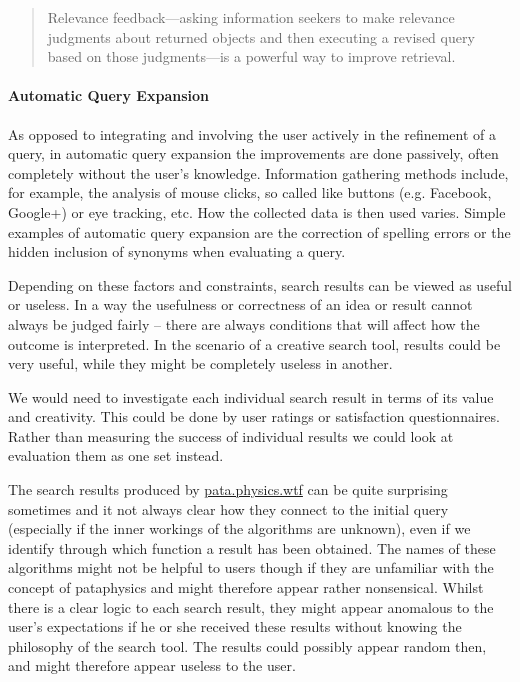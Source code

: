\begin{quotation}
  Relevance feedback---asking information seekers to make relevance judgments about returned objects and then executing a revised query based on those judgments---is a powerful way to improve retrieval. 
\end{quotation}

\paragraph{Automatic Query Expansion} As opposed to integrating and involving the user actively in the refinement of a query, in automatic query expansion the improvements are done passively, often completely without the user’s knowledge. Information gathering methods include, for example, the analysis of mouse clicks, so called like buttons (e.g. Facebook, Google+) or eye tracking, etc. How the collected data is then used varies. Simple examples of automatic query expansion are the correction of spelling errors or the hidden inclusion of synonyms when evaluating a query.

\spirals

Depending on these factors and constraints, search results can be viewed as useful or useless. In a way the usefulness or correctness of an idea or result cannot always be judged fairly – there are always conditions that will affect how the outcome is interpreted. In the scenario of a creative search tool, results could be very useful, while they might be completely useless in another.

We would need to investigate each individual search result in terms of its value and creativity. This could be done by user ratings or satisfaction questionnaires. Rather than measuring the success of individual results we could look at evaluation them as one set instead.

The search results produced by \url{pata.physics.wtf} can be quite surprising sometimes and it not always clear how they connect to the initial query (especially if the inner workings of the algorithms are unknown), even if we identify through which function a result has been obtained. The names of these algorithms might not be helpful to users though if they are unfamiliar with the concept of pataphysics and might therefore appear rather nonsensical. Whilst there is a clear logic to each search result, they might appear anomalous to the user's expectations if he or she received these results without knowing the philosophy of the search tool. The results could possibly appear random then, and might therefore appear useless to the user.


